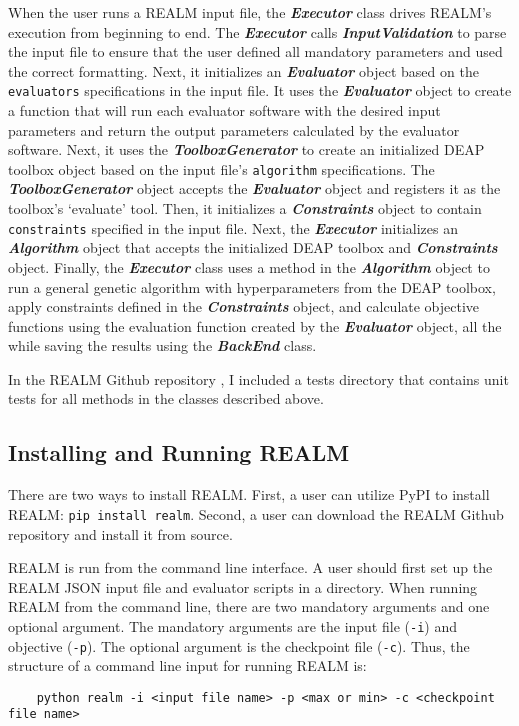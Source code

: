 When the user runs a \gls{REALM} input file, the \textbf{\textit{Executor}} class 
drives \gls{REALM}'s execution from beginning to end.
The \textbf{\textit{Executor}} calls \textbf{\textit{InputValidation}} to 
parse the input file to ensure that the user defined all mandatory parameters
and used the correct formatting.
Next, it initializes an \textbf{\textit{Evaluator}} object based on the 
\texttt{evaluators} specifications in the input file. 
It uses the \textbf{\textit{Evaluator}} object to create a function that will 
run each evaluator software with the desired input parameters and return the 
output parameters calculated by the evaluator software. 
Next, it uses the \textbf{\textit{ToolboxGenerator}} to create an initialized 
DEAP toolbox object based on the input file's \texttt{algorithm} specifications. 
The \textbf{\textit{ToolboxGenerator}} object accepts the 
\textbf{\textit{Evaluator}} object and registers it as the toolbox's `evaluate' 
tool.  
Then, it initializes a \textbf{\textit{Constraints}} object to contain 
\texttt{constraints} specified in the input file. 
Next, the \textbf{\textit{Executor}} initializes an \textbf{\textit{Algorithm}} 
object that accepts the initialized \gls{DEAP} toolbox and \textbf{\textit{Constraints}} 
object. 
Finally, the \textbf{\textit{Executor}} class uses a method in the 
\textbf{\textit{Algorithm}} object to run a general genetic algorithm with 
hyperparameters from the \gls{DEAP} toolbox, apply constraints defined in the 
\textbf{\textit{Constraints}} object, and calculate objective functions using 
the evaluation function created by the \textbf{\textit{Evaluator}} object, all 
the while saving the results using the \textbf{\textit{BackEnd}} class. 

In the \gls{REALM} Github repository \cite{chee_arfcrealm_2021}, I included a tests 
directory that contains unit tests for all methods in the classes described 
above. 

\subsection{Installing and Running REALM}
There are two ways to install \gls{REALM}.
First, a user can utilize \gls{PyPI} to install \gls{REALM}: \texttt{pip install realm}.
Second, a user can download the \gls{REALM} Github repository \cite{chee_arfcrealm_2021}
and install it from source. 

REALM is run from the command line interface. 
A user should first set up the \gls{REALM} JSON input file and evaluator 
scripts in a directory. 
When running \gls{REALM} from the command line, there are two mandatory arguments and 
one optional argument. 
The mandatory arguments are the input file (\texttt{-i}) and objective (\texttt{-p}). 
The optional argument is the checkpoint file (\texttt{-c}).  
Thus, the structure of a command line input for running \gls{REALM} is: 
\begin{verbatim}
    python realm -i <input file name> -p <max or min> -c <checkpoint file name>
\end{verbatim} 

